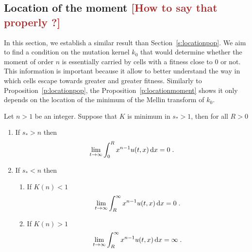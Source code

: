 \documentclass[11pt]{amsart}
\newcommand{\diff}{\,\mathrm{d}}
\newcommand{\ndr}[1]{\textcolor{brown}{[#1]}}
\begin{document}
\subsection{Location of the moment \ndr{How to say that properly ?}} \mbox{}

In this section, we establish a similar result than Section~\ref{s:locationpop}.  We aim to find a condition on the mutation kernel $k_0$ that would determine whether the moment of order $n$ is essentially carried by cells with a fitness close to 0 or not. This information is important because it allow to better understand the way in which cells escape towards greater and greater fitness. Similarly to Proposition~\ref{p:locationpop}, the Proposition~\ref{p:locationmoment} shows it only depends on the location of the minimum of the Mellin transform of $k_0$.

\begin{proposition}
    \label{p:locationmoment} Let $n>1$ be an integer. Suppose that $K$ is minimum in $s_* > 1$, then for all $R > 0$
    \begin{enumerate}
        \item If $s_* > n$ then 
    \begin{align*}
        \lim_{t\to \infty} \int_0^R x^{n-1} u(t,x) \diff x = 0
        \eqfinp
    \end{align*}
        \item If $s_* < n$ then 
        \begin{enumerate}
            \item If $K(n) < 1$
            \begin{align*}
                \lim_{t\to \infty} \int_R^{\infty} x^{n-1} u(t,x) \diff x = 0
                \eqfinp
            \end{align*}
            \item If $K(n) > 1$
            \begin{align*}
                \lim_{t\to \infty} \int_R^{\infty} x^{n-1} u(t,x) \diff x = \infty
                \eqfinp
            \end{align*}
        \end{enumerate}
    \end{enumerate}
\end{proposition}
\end{document}
